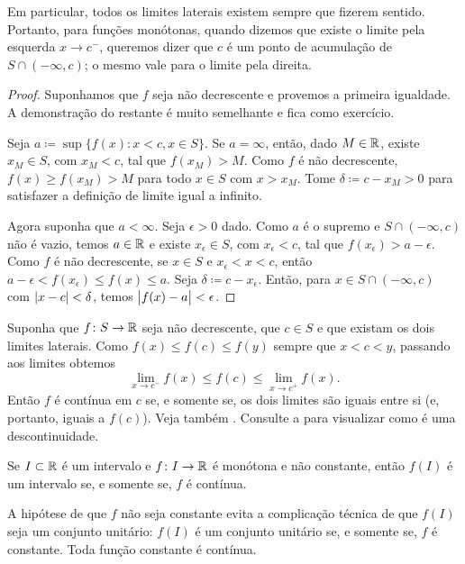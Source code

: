Em particular, todos os limites laterais existem sempre que fizerem
sentido. Portanto, para funções monótonas, quando dizemos que
existe o limite pela esquerda $x \to c^-$,
queremos dizer que $c$ é um ponto de acumulação de $S \cap (-\infty,c)$;
o mesmo vale para o limite pela direita.

\begin{proof}
Suponhamos que $f$ seja não decrescente e provemos a primeira
igualdade. A demonstração do restante é muito semelhante e fica como exercício.

Seja $a \coloneqq \sup \{ f(x) : x < c, x \in S \}$. Se $a = \infty$,
então, dado $M \in {\mathbb{R}}$, existe $x_M \in S$, com $x_M < c$, tal que $f(x_M) > M$.
Como $f$ é não decrescente, $f(x) \geq f(x_M) > M$ para todo $x \in S$ com $x > x_M$.
Tome $\delta \coloneqq c-x_M > 0$ para satisfazer a definição de limite
igual a infinito.

Agora suponha que $a < \infty$.
Seja $\epsilon > 0$ dado. Como $a$ é o supremo e
$S \cap (-\infty,c)$ não é vazio, temos $a \in {\mathbb{R}}$ e
existe
$x_\epsilon \in S$,
com $x_\epsilon < c$,
tal que $f(x_\epsilon) > a-\epsilon$. Como $f$ é não decrescente,
se $x \in S$ e $x_\epsilon < x < c$, então
$a-\epsilon < f(x_\epsilon) \leq f(x) \leq a$. Seja
$\delta \coloneqq c-x_\epsilon$. Então, para $x \in S \cap (-\infty,c)$
com $\lvert {x-c} \rvert < \delta$,
temos $\bigl\lvert {f(x)-a} \bigr\rvert < \epsilon$.
\end{proof}

Suponha que $f \colon S \to {\mathbb{R}}$ seja não decrescente, que $c \in S$ e
que existam os dois limites laterais.
Como $f(x) \leq f(c) \leq f(y)$
sempre que $x < c < y$, passando aos limites obtemos
\begin{equation*}
\lim_{x \to c^-} f(x) \leq f(c) \leq \lim_{x \to c^+} f(x) .
\end{equation*}
Então $f$ é contínua em $c$ se, e somente se, os dois limites são iguais
entre si (e, portanto, iguais a $f(c)$). Veja também
.
Consulte a  para visualizar como é uma descontinuidade.

\begin{cor} \label{cor:continterval}
Se $I \subset {\mathbb{R}}$ é um intervalo e $f \colon I \to {\mathbb{R}}$ é
monótona e não constante, então $f(I)$ é um intervalo se, e somente se, $f$
é contínua.
\end{cor}

A hipótese de que $f$ não seja constante evita a complicação técnica
de que $f(I)$ seja um conjunto unitário: $f(I)$ é um conjunto unitário
se, e somente se, $f$ é constante. Toda função constante é
contínua.

